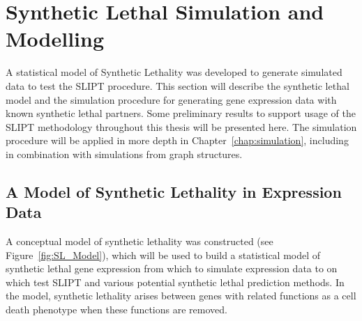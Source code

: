 

\FloatBarrier

\section{Synthetic Lethal Simulation and Modelling} \label{methods:simulation_SL_expression} 

A statistical model of Synthetic Lethality was developed to generate simulated data to test the \gls{SLIPT} procedure. This section will describe the synthetic lethal model and the simulation procedure for generating gene expression data with known synthetic lethal partners. Some preliminary results to support usage of the \gls{SLIPT} methodology throughout this thesis will be presented here. The simulation procedure will be applied in more depth in Chapter~\ref{chap:simulation}, including in combination with simulations from graph structures.

\subsection{A Model of Synthetic Lethality in Expression Data} \label{methods:SL_Model}

A conceptual model of synthetic lethality was constructed (see Figure~\ref{fig:SL_Model}), which will be used to build a statistical model of synthetic lethal gene expression from which to simulate expression data to on which test SLIPT and various potential synthetic lethal prediction methods. In the model, synthetic lethality arises between genes with related functions as a cell death phenotype when these functions are removed.

